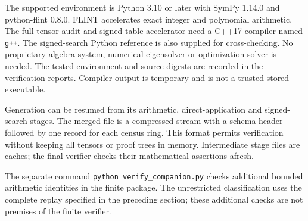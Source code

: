 \documentclass[11pt]{article}
\begin{document}
The supported environment is Python 3.10 or later with SymPy 1.14.0
and python-flint 0.8.0. FLINT accelerates exact integer and polynomial
arithmetic. The full-tensor audit and signed-table accelerator need a
C++17 compiler named \texttt{g++}.
The signed-search Python reference
is also supplied for cross-checking. No proprietary algebra system,
numerical eigensolver or optimization solver is needed. The tested
environment and source digests are recorded in the verification reports.
Compiler output is temporary and is not a trusted stored executable.

Generation can be resumed from its arithmetic, direct-application and
signed-search stages. The merged file
 is a compressed stream with
a schema header followed by one record for each census ring. This
format permits verification without keeping all tensors or proof trees
in memory. Intermediate stage files are caches; the final verifier
checks their mathematical assertions afresh.

The separate command \texttt{python verify\_companion.py} checks additional
bounded arithmetic identities in the finite package. The unrestricted
classification uses the complete replay specified in the preceding
section; these additional checks are not premises of the finite verifier.
\end{document}
